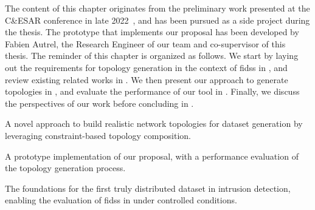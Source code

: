 The content of this chapter originates from the preliminary work presented at the C\&ESAR conference in late 2022~\cite{lavaur_cesar_2022}, and has been pursued as a side project during the thesis.
The prototype that implements our proposal has been developed by Fabien Autrel, the Research Engineer of our team and co-supervisor of this thesis.
The reminder of this chapter is organized as follows.
We start by laying out the requirements for topology generation in the context of \glspl{fids} in , and review existing related works in .
We then present our approach to generate topologies in , and evaluate the performance of our tool in .
Finally, we discuss the perspectives of our work before concluding in .

\begin{contribs}
  \item A novel approach to build realistic network topologies for dataset generation by leveraging constraint-based topology composition.
  \item A prototype implementation of our proposal, with a performance evaluation of the topology generation process.
  \item The foundations for the first truly distributed dataset in intrusion detection, enabling the evaluation of \glspl{fids} in under controlled conditions.
\end{contribs}